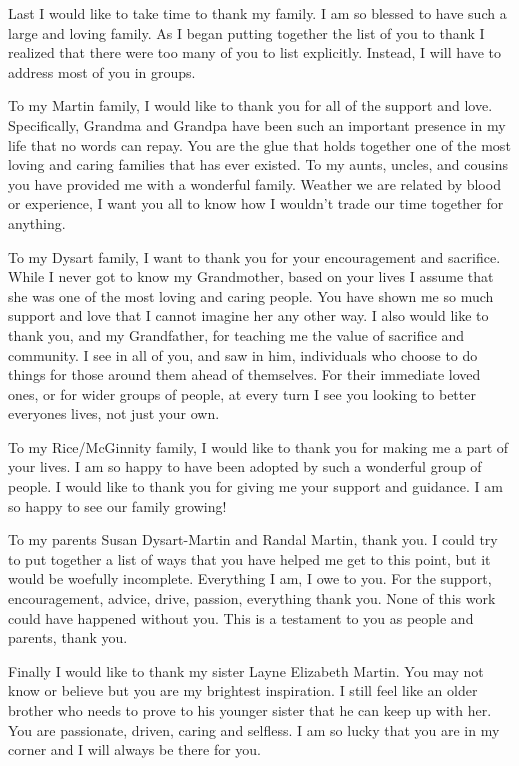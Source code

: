\begin{frontmatter}
\begin{acknowledgement}
Last I would like to take time to thank my family. I am so blessed to have such a large and loving family. As I began putting together the list of you to thank I realized that there were too many of you to list explicitly. Instead, I will have to address most of you in groups.

To my Martin family, I would like to thank you for all of the support and love. Specifically, Grandma and Grandpa have been such an important presence in my life that no words can repay. You are the glue that holds together one of the most loving and caring families that has ever existed. To my aunts, uncles, and cousins you have provided me with a wonderful family. Weather we are related by blood or experience, I want you all to know how I wouldn't trade our time together for anything.

To my Dysart family, I want to thank you for your encouragement and sacrifice. While I never got to know my Grandmother, based on your lives I assume that she was one of the most loving and caring people. You have shown me so much support and love that I cannot imagine her any other way. I also would like to thank you, and my Grandfather, for teaching me the value of sacrifice and community. I see in all of you, and saw in him, individuals who choose to do things for those around them ahead of themselves. For their immediate loved ones, or for wider groups of people, at every turn I see you looking to better everyones lives, not just your own.

To my Rice/McGinnity family, I would like to thank you for making me a part of your lives. I am so happy to have been adopted by such a wonderful group of people. I would like to thank you for giving me your support and guidance. I am so happy to see our family growing!

To my parents Susan Dysart-Martin and Randal Martin, thank you. I could try to put together a list of ways that you have helped me get to this point, but it would be woefully incomplete. Everything I am, I owe to you. For the support, encouragement, advice, drive, passion, everything thank you. None of this work could have happened without you. This is a testament to you as people and parents, thank you.

Finally I would like to thank my sister Layne Elizabeth Martin. You may not know or believe but you are my brightest inspiration. I still feel like an older brother who needs to prove to his younger sister that he can keep up with her. You are passionate, driven, caring and selfless. I am so lucky that you are in my corner and I will always be there for you.

\end{acknowledgement}



\tableofcontents

\listoftables

\listoffigures

\end{frontmatter}